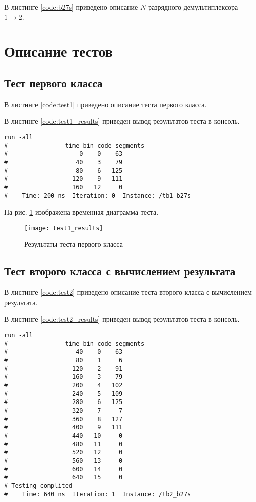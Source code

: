 \noindent В листинге \ref{code:b27s} приведено описание $N$-разрядного демультиплексора $1 \rightarrow 2$.


\section{Описание тестов}
\label{sec:tests}

\subsection{Тест первого класса}

В листинге \ref{code:test1} приведено описание теста первого класса.


В листинге \ref{code:test1_results} приведен вывод результатов теста в консоль.
\begin{lstlisting}[caption=Результаты теста первого класса, label=code:test1_results, style=console]
run -all
# 		         time bin_code segments
#                    0    0    63
#                   40    3    79
#                   80    6   125
#                  120    9   111
#                  160   12     0
#    Time: 200 ns  Iteration: 0  Instance: /tb1_b27s
\end{lstlisting}

На рис. \ref{fig:test1_results} изображена временная диаграмма теста.
\begin{figure}[H]
	\begin{center}
		\texttt{[image: test1\_results]}
		\caption{Результаты теста первого класса}
		\label{fig:test1_results}
	\end{center}
\end{figure}

\subsection{Тест второго класса с вычислением результата}

В листинге \ref{code:test2} приведено описание теста второго класса с вычислением результата.


В листинге \ref{code:test2_results} приведен вывод результатов теста в консоль.
\begin{lstlisting}[caption=Результаты теста второго класса с вычислением результата, label=code:test2_results, style=console]
run -all
# 		         time bin_code segments
#                   40    0    63
#                   80    1     6
#                  120    2    91
#                  160    3    79
#                  200    4   102
#                  240    5   109
#                  280    6   125
#                  320    7     7
#                  360    8   127
#                  400    9   111
#                  440   10     0
#                  480   11     0
#                  520   12     0
#                  560   13     0
#                  600   14     0
#                  640   15     0
# Testing complited
#    Time: 640 ns  Iteration: 1  Instance: /tb2_b27s
\end{lstlisting}

